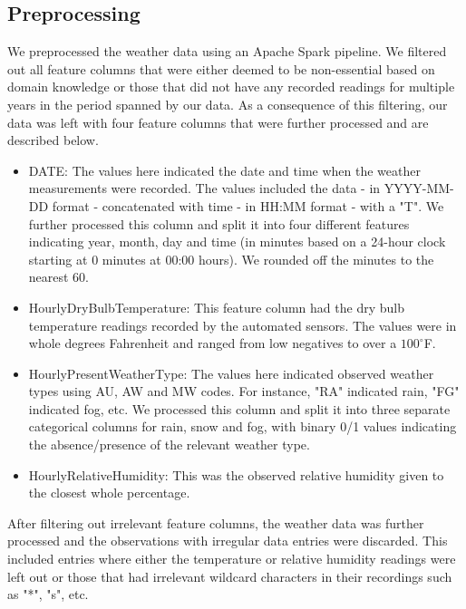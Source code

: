 \documentclass[conference]{IEEEtran}
\begin{document}
\subsection{Preprocessing}
We preprocessed the weather data using an Apache Spark pipeline. 
We filtered out all feature columns that were either deemed to be non-essential based on domain knowledge or those that did not have any recorded readings for multiple years in the period spanned by our data. 
As a consequence of this filtering, our data was left with four feature columns that were further processed and are described below.
\begin{itemize}
    \item DATE: The values here indicated the date and time when the weather measurements were recorded. The values included the data - in YYYY-MM-DD format - concatenated with time - in HH:MM format - with a "T". 
    We further processed this column and split it into four different features indicating year, month, day and time (in minutes based on a 24-hour clock starting at 0 minutes at 00:00 hours). 
    We rounded off the minutes to the nearest 60.
    \item HourlyDryBulbTemperature: This feature column had the dry bulb temperature readings recorded by the automated sensors. 
    The values were in whole degrees Fahrenheit and ranged from low negatives to over a $100^{\circ}$F.
    \item HourlyPresentWeatherType: The values here indicated observed weather types using AU, AW and MW codes. 
    For instance, "RA" indicated rain, "FG" indicated fog, etc. We processed this column and split it into three separate categorical columns for rain, snow and fog, with binary 0/1 values indicating the absence/presence of the relevant weather type.
    \item HourlyRelativeHumidity: This was the observed relative humidity given to the closest whole percentage.
\end{itemize}

After filtering out irrelevant feature columns, the weather data was further processed and the observations with irregular data entries were discarded.
This included entries where either the temperature or relative humidity readings were left out or those that had irrelevant wildcard characters in their recordings such as "*", "s", etc.
\end{document}
